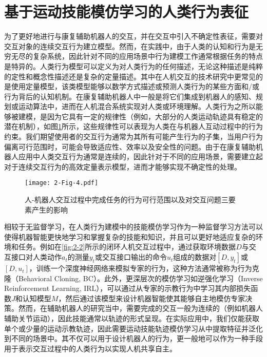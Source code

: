 \section{基于运动技能模仿学习的人类行为表征}
为了更好地进行与康复辅助机器人的交互，并在交互中引入不确定性表征，需要对交互对象的连续交互行为建立模型。然而，在实践中，由于人类的认知和行为是无穷无尽的复杂系统，因此针对不同的应用场景中行为建模工作通常根据任务的特点是特异的。人类行为模型可以定义为对人类行为的任何描述，无论这种描述是纯粹的定性和概念性描述还是复杂的定量描述。其中在人机交互的技术研究中更常见的是使用定量模型，该类模型能够以数学方式描述或预测人类行为的某些方面和/或行为背后的认知机制。在康复辅助机器人中一般是将它们集成到机器人的感知、规划或运动算法中，进而在人机混合系统实现对人类或环境理解\cite{markkulaModelsHumanBehavior2024}。人类行为之所以能够被建模，是因为它具有一定的规律性（例如，大部分的人类运动轨迹具有稳定的潜在机制），如图\ref{fig:2-4}所示，这些规律性可以表现为人类在与机器人互动过程中的行为约束。我们期望使用者的交互行为通常为其所有可能产生行为的子集，当用户行为偏离可行范围时，可能会导致适应性、效率以及安全性的问题。由于在康复辅助机器人应用中人类交互行为通常是连续的，因此针对于不同的应用场景，需要建立起对于连续交互行为的高效定量表示模型，进而才能够实现不确定性的处理。

\begin{figure}[htb]
    \centering
    \texttt{[image: 2-Fig-4.pdf]}
    \caption{人-机器人交互过程中完成任务的行为可行范围以及对交互问题三要素产生的影响\cite{markkulaModelsHumanBehavior2024}}
    \label{fig:2-4}
\end{figure}

相较于无监督学习，在人类行为建模中的技能模仿学习作为一种监督学习方法可以使得机器智能更快地学习和掌握复杂的技能和知识，并且可以更好地适应复杂的环境和任务。例如在\ref{fig:2-2}所示的闭环人机交互过程中，通过获取环境数据$D$与交互接口对人类动作$a_t$的测量$y_t$或交互接口输出的命令$u_t$组成的数据对$[D,y_t]$或$[D,u_t]$，训练一个深度神经网络来模拟专家的行为，这种方法通常被称为行为克隆（Behavioral Cloning, BC）。此外，更深层次的模仿学习如逆强化学习（Inverse Reinforcement Learning, IRL），可以通过从专家的示教行为中学习其内部损失函数$J$和认知模型$M$，然后通过该模型来设计机器智能使其能够自主地模仿专家决策。然而，在辅助机器人的研究当中，需要完成的交互一般为连续的（例如机器人辅助关节运动），因此技能通常以轨迹的形式呈现。在实际应用中，我们仅能获取单个或少量的运动示教轨迹，因此需要运动技能轨迹模仿学习从中提取特征并泛化到不同的场景中。其不仅可以用于设计机器人的行为，更一般地可以作为一种手段用于表示交互过程中的人类行为以实现人机共享自主。

